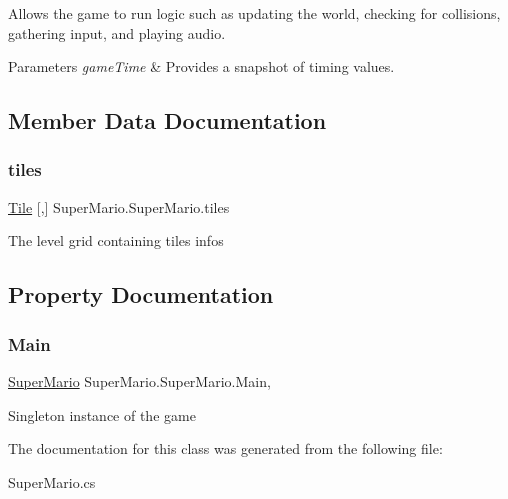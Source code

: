 Allows the game to run logic such as updating the world, checking for collisions, gathering input, and playing audio. 


\begin{DoxyParams}{Parameters}
{\em game\+Time} & Provides a snapshot of timing values.\\
\hline
\end{DoxyParams}


\subsection{Member Data Documentation}
\mbox{\label{class_super_mario_1_1_super_mario_a6f0b4c9d00e636d974465ea28e7b32c3}} 
\subsubsection{\texorpdfstring{tiles}{tiles}}
{\footnotesize\ttfamily \mbox{\hyperlink{class_super_mario_1_1_tile}{Tile}} \mbox{[},\mbox{]} Super\+Mario.\+Super\+Mario.\+tiles}



The level grid containing tiles infos 



\subsection{Property Documentation}
\mbox{\label{class_super_mario_1_1_super_mario_abac25334ac6abafdedbf46774e6a198e}} 
\subsubsection{\texorpdfstring{Main}{Main}}
{\footnotesize\ttfamily \mbox{\hyperlink{class_super_mario_1_1_super_mario}{Super\+Mario}} Super\+Mario.\+Super\+Mario.\+Main\hspace{0.3cm}{\ttfamily [static]}, {\ttfamily [get]}}



Singleton instance of the game 



The documentation for this class was generated from the following file\+:\begin{DoxyCompactItemize}
\item 
Super\+Mario.\+cs\end{DoxyCompactItemize}
